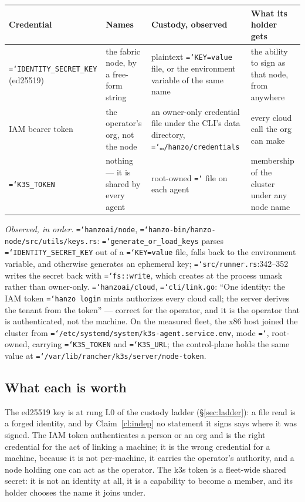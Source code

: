 \documentclass[11pt,a4paper]{article}
\newcommand{\code}[1]{\texttt{\hyphenchar\font=`\-\relax #1}}
\begin{document}
\begin{center}
\small
\begin{tabular}{@{}>{\raggedright\arraybackslash}p{}>{\raggedright\arraybackslash}p{}>{\raggedright\arraybackslash}p{}>{\raggedright\arraybackslash}p{}@{}}
\toprule
\textbf{Credential} & \textbf{Names} & \textbf{Custody, observed} & \textbf{What its holder gets} \\
\midrule
\code{IDENTITY\_SEC\-RET\_KEY} (ed25519) &
the fabric node, by a free-form string &
plaintext \code{KEY=value} file, or the environment variable of the same name &
the ability to sign as that node, from anywhere \\[3pt]
IAM bearer token &
the operator's org, not the node &
an owner-only credential file under the CLI's data directory,
\code{\dots/hanzo/credentials} &
every cloud call the org can make \\[3pt]
\code{K3S\_TOKEN} &
nothing --- it is shared by every agent &
root-owned \code{0600} file on each agent &
membership of the cluster under any node name \\
\bottomrule
\end{tabular}
\end{center}

\emph{Observed, in order.} \code{hanzoai/node},
\code{hanzo-bin/hanzo-node/src/utils/keys.rs}: \code{generate\_or\_load\_keys}
parses \code{IDENTITY\_SECRET\_KEY} out of a \code{KEY=value} file, falls back to
the environment variable, and otherwise generates an ephemeral key;
\code{src/runner.rs}:342--352 writes the secret back with \code{fs::write}, which
creates at the process umask rather than owner-only. \code{hanzoai/cloud},
\code{cli/link.go}: ``One identity: the IAM token \code{hanzo login} mints
authorizes every cloud call; the server derives the tenant from the token'' ---
correct for the operator, and it is the operator that is authenticated, not the
machine. On the measured fleet, the x86 host joined the cluster from
\code{/etc/systemd/system/k3s-agent.service.env}, mode \code{0600}, root-owned,
carrying \code{K3S\_TOKEN} and \code{K3S\_URL}; the control-plane holds the same
value at \code{/var/lib/rancher/k3s/server/node-token}.

\subsection{What each is worth}

The ed25519 key is at rung L0 of the custody ladder (\S\ref{sec:ladder}): a file
read is a forged identity, and by Claim~\ref{cl:indep} no statement it signs says
where it was signed. The IAM token authenticates a person or an org and is the
right credential for the act of linking a machine; it is the wrong credential for
a machine, because it is not per-machine, it carries the operator's authority, and
a node holding one can act as the operator. The k3s token is a fleet-wide shared
secret: it is not an identity at all, it is a capability to become a member, and
its holder chooses the name it joins under.
\end{document}
